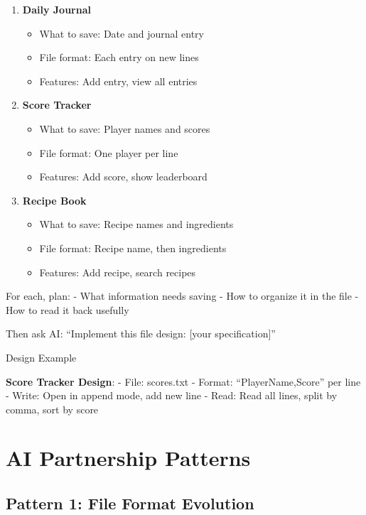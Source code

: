 \documentclass[
  letterpaper,
  DIV=11,
  numbers=noendperiod,
  oneside]{scrreprt}
\providecommand{\tightlist}{%
  \setlength{\itemsep}{0pt}\setlength{\parskip}{0pt}}\usepackage{longtable,booktabs,array}
\begin{document}
\begin{enumerate}
\def\labelenumi{\arabic{enumi}.}
\tightlist
\item
  \textbf{Daily Journal}

  \begin{itemize}
  \tightlist
  \item
    What to save: Date and journal entry
  \item
    File format: Each entry on new lines
  \item
    Features: Add entry, view all entries
  \end{itemize}
\item
  \textbf{Score Tracker}

  \begin{itemize}
  \tightlist
  \item
    What to save: Player names and scores
  \item
    File format: One player per line
  \item
    Features: Add score, show leaderboard
  \end{itemize}
\item
  \textbf{Recipe Book}

  \begin{itemize}
  \tightlist
  \item
    What to save: Recipe names and ingredients
  \item
    File format: Recipe name, then ingredients
  \item
    Features: Add recipe, search recipes
  \end{itemize}
\end{enumerate}

For each, plan: - What information needs saving - How to organize it in
the file - How to read it back usefully

Then ask AI: ``Implement this file design: {[}your specification{]}''

Design Example

\textbf{Score Tracker Design}: - File: scores.txt - Format:
``PlayerName,Score'' per line - Write: Open in append mode, add new line
- Read: Read all lines, split by comma, sort by score

\section{AI Partnership Patterns}\label{ai-partnership-patterns-7}

\subsection{Pattern 1: File Format
Evolution}\label{pattern-1-file-format-evolution}
\end{document}
